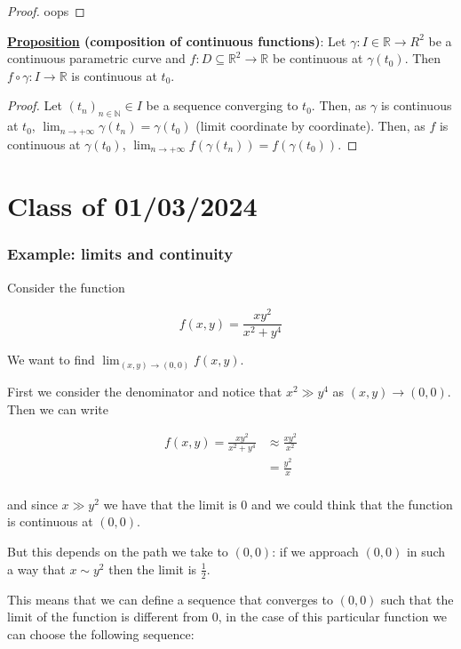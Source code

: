 \documentclass[10pt]{extarticle}
\newcommand{\R}{\mathbb{R}}
\newcommand{\N}{\mathbb{N}}
\begin{document}
\begin{proof}
    oops
\end{proof}

\textbf{\underline{Proposition} (composition of continuous functions)}:
Let $\gamma: I \in \R \to R^2$ be a continuous parametric curve and $f: D \subseteq \R^2 \to \R$ be continuous at $\gamma(t_0)$.
Then $f \circ \gamma: I \to \R$ is continuous at $t_0$.

\begin{proof}
    Let $\left(t_n\right)_{n \in \N} \in I$ be a sequence converging to $t_0$.
    Then, as $\gamma$ is continuous at $t_0$, $\lim_{n \to +\infty} \gamma(t_n) = \gamma(t_0)$ (limit coordinate by coordinate).
    Then, as $f$ is continuous at $\gamma(t_0)$, $\lim_{n \to +\infty} f(\gamma(t_n)) = f(\gamma(t_0))$.
\end{proof}

\section{Class of 01/03/2024}

\subsubsection{Example: limits and continuity}

Consider the function

$$
    f(x, y) = \frac{x y^2}{x^2 + y^4}
$$

We want to find $\lim_{(x, y) \to (0, 0)} f(x, y)$.

First we consider the denominator and notice that $x^2 \gg y^4$ as $(x, y) \to (0, 0)$.
Then we can write

\begin{align*}
    f(x, y) = \frac{x y^2}{x^2 + y^4} & \approx \frac{x y^2}{x^2} \\
                                      & = \frac{y^2}{x}           \\
\end{align*}

and since $x \gg y^2$ we have that the limit is 0 and we could think that the function is continuous at $(0, 0)$.

But this depends on the path we take to $(0, 0)$: if we approach $(0, 0)$ in such a way that $x \sim y^2$ then the limit is $\frac{1}{2}$.

This means that we can define a sequence that converges to $(0, 0)$ such that the limit of the function is different from 0, in the case of this particular function we can choose the following sequence:
\end{document}
